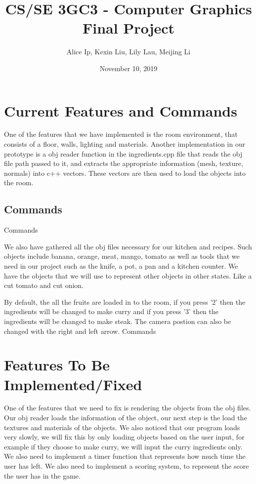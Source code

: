 \documentclass[11pt]{article}
\author{Alice Ip, Kexin Liu, Lily Lau, Meijing Li}
\date{November 10, 2019}
\title{CS/SE 3GC3 - Computer Graphics Final Project}
\begin{document}
\maketitle

\section*{Current Features and Commands}
\label{sec:orgbf833e3}
One of the features that we have implemented is the room environment, that consists of a floor, walls, lighting and materials. Another implementation in our prototype is a obj reader function in the ingredients.cpp file that reads the obj file path passed to it, and extracts the appropriate information (mesh, texture, normals) into c++ vectors. These vectors are then used to load the objects into the room.

\subsection*{Commands}
\label{sec:orge3f92ac}

Commands

We also have gathered all the obj files necessary for our kitchen and recipes. Such objects include banana, orange, meat, mango, tomato as well as tools that we need in our project such as the knife, a pot, a pan and a kitchen counter.
We have the objects that we will use to represent other objects in other states. Like a cut tomato and cut onion.   

By default, the  all the fruits are loaded in to the room, if you press '2' then the ingredients will be changed to make curry and if you press '3' then the ingredients will be changed to make steak. 
The camera postion can also be changed with the right and left arrow. 
Commands

\section*{Features To Be Implemented/Fixed}
\label{sec:orged7b5dd}
One of the features that we need to fix is rendering the objects from the obj files. Our obj reader loads the information of the object, our next step is the load the textures and materials of the objects. 
We also noticed that our program loads very slowly, we will fix this by only loading objects based on the user input, for example if they choose to make curry, we will input the curry ingredients only. 
We also need to implement a timer function that represents how much time the user has left. We also need to implement a scoring system, to represent the score the user has in the game.
\end{document}
